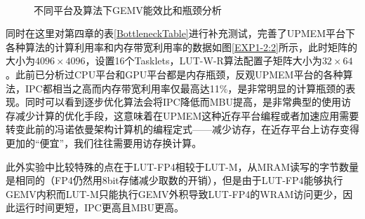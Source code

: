 \begin{figure}[htbp!]
	\centering
	\\
	\caption{不同平台及算法下GEMV能效比和瓶颈分析}
	\label{EXP1-2}
\end{figure}

同时在这里对第四章的表\ref{BottleneckTable}进行补充测试，完善了UPMEM平台下各种算法的计算利用率和内存带宽利用率的数据如图\ref{EXP1-2:2}所示，此时矩阵的大小为$4096\times 4096$，设置16个Tasklets，LUT-W-R算法配置子矩阵大小为$32\times 64$。此前已分析过CPU平台和GPU平台都是内存瓶颈，反观UPMEM平台的各种算法，IPC都相当之高而内存带宽利用率仅最高达11\%，是非常明显的计算瓶颈的表现。同时可以看到逐步优化算法会将IPC降低而MBU提高，是非常典型的使用访存减少计算的优化手段，这意味着在UPMEM这种近存平台编程或者加速应用需要转变此前的冯诺依曼架构计算机的编程定式——减少访存，在近存平台上访存变得更加的“便宜”，我们往往需要用访存换计算。

此外实验中比较特殊的点在于LUT-FP4相较于LUT-M，从MRAM读写的字节数量是相同的（FP4仍然用8bit存储减少取数的开销），但是由于LUT-FP4能够执行GEMV内积而LUT-M只能执行GEMV外积导致LUT-FP4的WRAM访问更少，因此运行时间更短，IPC更高且MBU更高。


